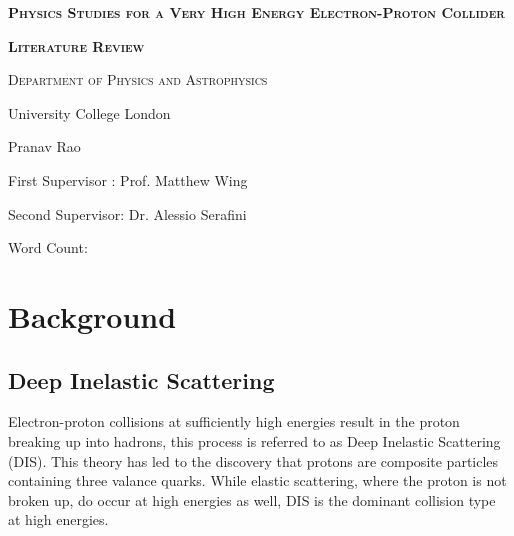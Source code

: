 \documentclass[journal, a4paper,12pt]{IEEEtran}
\begin{document}
\begin{titlepage}
	\centering
    \vspace{2cm}
    {\scshape\LARGE\bfseries Physics Studies for a Very High Energy Electron-Proton Collider\par}
	{\scshape\Large\bfseries Literature Review\par}
	\vspace{2cm}
	{\scshape\Large Department of Physics and Astrophysics\par University College London\par}
	\vspace{2cm}
	{\huge\bfseries\par}
	{\large Pranav Rao\par}
	{\large First Supervisor : Prof. Matthew Wing\par Second Supervisor: Dr. Alessio Serafini\par}
	\vspace{10cm}
	Word Count: 

	\vfill
\end{titlepage}

    
\justify
\section{Background}

\subsection{Deep Inelastic Scattering}

Electron-proton collisions at sufficiently high energies result in the proton breaking up into hadrons, this process is referred to as Deep Inelastic Scattering (DIS). This theory has led to the discovery that protons are composite particles containing three valance quarks. While elastic scattering, where the proton is not broken up, do occur at high energies as well, DIS is the dominant collision type at high energies.
\end{document}
